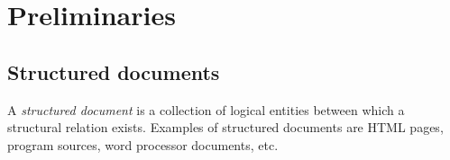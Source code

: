 









\section{Preliminaries}

\subsection{Structured documents} \label{sect:structdocs}



A {\em structured document} is a collection of logical entities between which a structural relation exists. Examples of structured documents are HTML pages, program sources, word processor documents, etc. 

